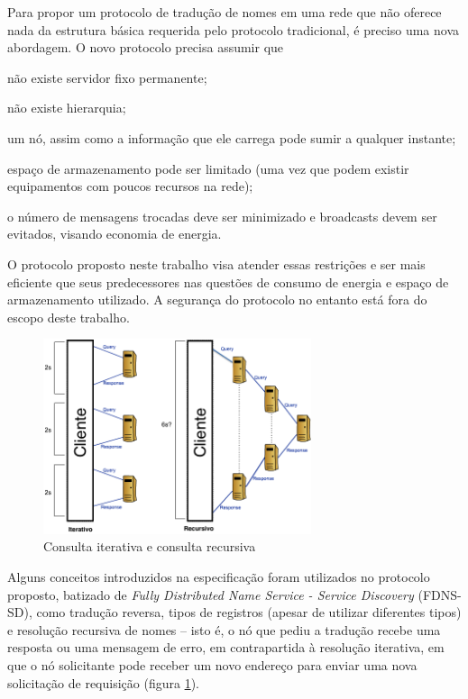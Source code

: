 Para propor um protocolo de tradução de nomes em uma rede que não oferece nada
da estrutura básica requerida pelo protocolo tradicional, é preciso uma nova
abordagem. O novo protocolo precisa assumir que
\begin{inparaenum}[(i)]
    \item não existe servidor fixo permanente;
    \item não existe hierarquia;
    \item um nó, assim como a informação que ele carrega pode sumir a qualquer
    instante;
    \item espaço de armazenamento pode ser limitado (uma vez que podem existir
    equipamentos com poucos recursos na rede);
    \item o número de mensagens trocadas deve ser minimizado e broadcasts devem
    ser evitados, visando economia de energia.
\end{inparaenum}

O protocolo proposto neste trabalho visa atender essas restrições e ser mais
eficiente que seus predecessores \cite{mcdns} \cite{dnssd} \cite{mdns} nas questões
de consumo de energia e espaço de armazenamento utilizado. A segurança do protocolo
no entanto está fora do escopo deste trabalho.

\begin{figure}[h!]
    \centering
    \includegraphics[width=0.7\textwidth]{figures/datagram-timing}
    \caption{Consulta iterativa e consulta recursiva}
    \label{consultas}
\end{figure}

Alguns conceitos introduzidos na especificação \cite{rfc1035} foram utilizados no
protocolo proposto, batizado de \textit{Fully Distributed Name Service - Service
Discovery} (FDNS-SD), como tradução reversa, tipos de registros (apesar de utilizar
diferentes tipos) e resolução recursiva de nomes -- isto é, o nó que pediu a
tradução recebe uma resposta ou uma mensagem de erro, em contrapartida à resolução
iterativa, em que o nó solicitante pode receber um novo endereço para enviar uma
nova solicitação de requisição (figura \ref{consultas}).

